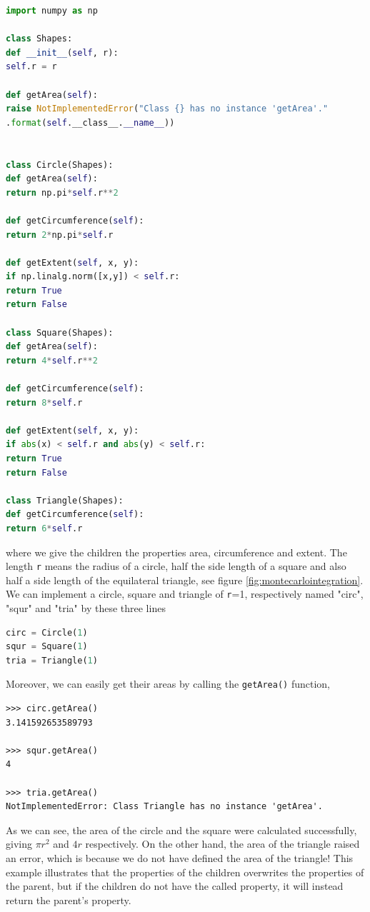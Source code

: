 \lstset{basicstyle=\scriptsize}
\begin{lstlisting}[language=python]
import numpy as np

class Shapes:
def __init__(self, r):
self.r = r

def getArea(self):
raise NotImplementedError("Class {} has no instance 'getArea'."
.format(self.__class__.__name__))


class Circle(Shapes):
def getArea(self):
return np.pi*self.r**2

def getCircumference(self):
return 2*np.pi*self.r

def getExtent(self, x, y):
if np.linalg.norm([x,y]) < self.r:
return True
return False

class Square(Shapes):
def getArea(self):
return 4*self.r**2

def getCircumference(self):
return 8*self.r

def getExtent(self, x, y):
if abs(x) < self.r and abs(y) < self.r:
return True
return False

class Triangle(Shapes):
def getCircumference(self):
return 6*self.r
\end{lstlisting}
where we give the children the properties area, circumference and extent. The length \texttt{r} means the radius of a circle, half the side length of a square and also half a side length of the equilateral triangle, see figure \eqref{fig:montecarlointegration}. We can implement a circle, square and triangle of \texttt{r}=1, respectively named "circ", "squr" and "tria" by these three lines
\lstset{basicstyle=\scriptsize}
\begin{lstlisting}[language=python]
circ = Circle(1)
squr = Square(1)
tria = Triangle(1)
\end{lstlisting}
Moreover, we can easily get their areas by calling the \texttt{getArea()} function,
\lstset{basicstyle=\scriptsize}
\begin{lstlisting}
>>> circ.getArea()
3.141592653589793

>>> squr.getArea()
4

>>> tria.getArea()
NotImplementedError: Class Triangle has no instance 'getArea'.
\end{lstlisting}

As we can see, the area of the circle and the square were calculated successfully, giving $\pi r^2$ and $4r$ respectively. On the other hand, the area of the triangle raised an error, which is because we do not have defined the area of the triangle! This example illustrates that the properties of the children overwrites the properties of the parent, but if the children do not have the called property, it will instead return the parent's property. 

